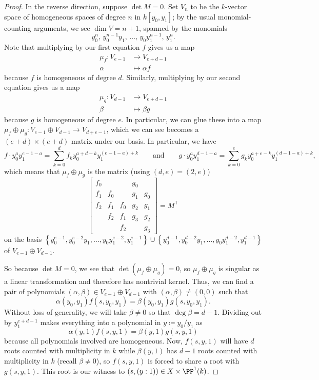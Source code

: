 \begin{proof}
	In the reverse direction, suppose $\det M=0$. Set $V_n$ to be the $k$-vector space of homogeneous spaces of degree $n$ in $k[y_0,y_1]$; by the usual monomial-counting arguments, we see $\dim V=n+1$, spanned by the monomials
	\[y_0^n,\,y_0^{n-1}y_1,\,\ldots,\,y_0y_1^{n-1},\,y_1^n.\]
	Note that multiplying by our first equation $f$ gives us a map
	\begin{align*}
		\mu_f\colon V_{e-1} &\to V_{e+d-1} \\
		\alpha &\mapsto \alpha f
	\end{align*}
	because $f$ is homogeneous of degree $d$. Similarly, multiplying by our second equation gives us a map
	\begin{align*}
		\mu_g\colon V_{d-1} &\to V_{e+d-1} \\
		\beta &\mapsto \beta g
	\end{align*}
	because $g$ is homogeneous of degree $e$. In particular, we can glue these into a map $\mu_f\oplus\mu_g\colon V_{e-1}\oplus V_{d-1}\to V_{d+e-1}$, which we can see becomes a $(e+d)\times(e+d)$ matrix under our basis. In particular, we have
	\[f\cdot y_0^ay_1^{e-1-a}=\sum_{k=0}^df_ky_0^{a+d-k}y_1^{(e-1-a)+k}\qquad\text{and}\qquad g\cdot y_0^ay_1^{d-1-a}=\sum_{k=0}^eg_ky_0^{a+e-k}y_1^{(d-1-a)+k},\]
	which means that $\mu_f\oplus\mu_g$ is the matrix (using $(d,e)=(2,e)$)
	\[\begin{bmatrix}
		f_0 &     &     & g_0 &     \\
		f_1 & f_0 &     & g_1 & g_0 \\
		f_2 & f_1 & f_0 & g_2 & g_1 \\
		    & f_2 & f_1 & g_3 & g_2 \\
			&     & f_2 &     & g_3
	\end{bmatrix}=M^\intercal\]
	on the basis $\left\{y_0^{e-1},y_0^{e-2}y_1,\ldots,y_0y_1^{e-2},y_1^{e-1}\right\}\cup\left\{y_0^{d-1},y_0^{d-2}y_1,\ldots,y_0y_1^{d-2},y_1^{d-1}\right\}$ of $V_{e-1}\oplus V_{d-1}$.
	
	So because $\det M=0$, we see that $\det(\mu_f\oplus\mu_g)=0$, so $\mu_f\oplus\mu_g$ is singular as a linear transformation and therefore has nontrivial kernel. Thus, we can find a pair of polynomials $(\alpha,\beta)\in V_{e-1}\oplus V_{d-1}$ with $(\alpha,\beta)\ne(0,0)$ such that
	\[\alpha(y_0,y_1)f(s,y_0,y_1)=\beta(y_0,y_1)g(s,y_0,y_1).\]
	Without loss of generality, we will take $\beta\ne0$ so that $\deg\beta=d-1$. Dividing out by $y_1^{e+d-1}$ makes everything into a polynomial in $y\coloneqq y_0/y_1$ as
	\[\alpha(y,1)f(s,y,1)=\beta(y,1)g(s,y,1)\]
	because all polynomials involved are homogeneous. Now, $f(s,y,1)$ will have $d$ roots counted with multiplicity in $k$ while $\beta(y,1)$ has $d-1$ roots counted with multiplicity in $k$ (recall $\beta\ne0$), so $f(s,y,1)$ is forced to share a root with $g(s,y,1)$. This root is our witness to $(s,(y:1))\in X\times\PP^1(k)$.
\end{proof}
